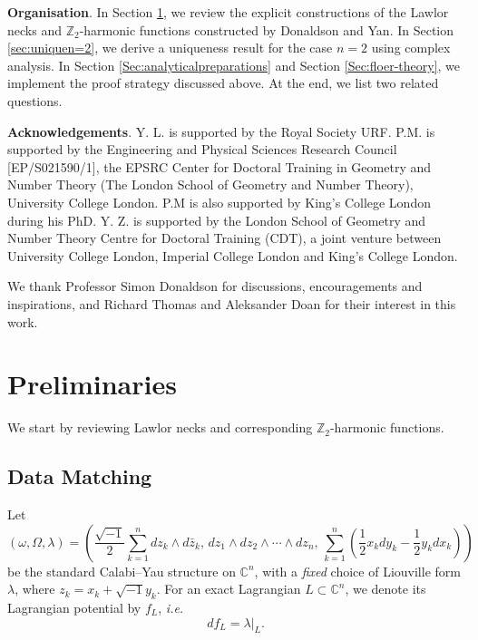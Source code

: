 \documentclass[11pt,a4paper]{article}
\numberwithin{equation}{section}%
\theoremstyle{definition}
\newcommand{\ie}{\emph{i.e.} }
\newcommand{\C}{\mathbb{C}}
\newcommand{\Z}{\mathbb{Z}}
\begin{document}
\textbf{Organisation}. In Section \ref{Sec:preliminaries}, we review the explicit constructions of the Lawlor necks and $\Z_2$-harmonic functions constructed by Donaldson and Yan. In Section \ref{sec:uniquen=2}, we derive a uniqueness result for the case $n=2$ using complex analysis. In Section \ref{Sec:analyticalpreparations} and Section \ref{Sec:floer-theory}, we implement the proof strategy discussed above. At the end, we list two related questions. 

\textbf{Acknowledgements}. Y. L. is supported by the Royal Society URF. P.M.  is supported by the Engineering and Physical Sciences Research Council [EP/S021590/1], the EPSRC Center for Doctoral Training in Geometry and Number Theory (The London School of Geometry and Number Theory), University College London. P.M is also supported by King’s College London during his PhD. Y. Z. is supported by the London School of Geometry and Number Theory Centre for Doctoral Training (CDT), a joint venture between University College London, Imperial College London and King’s College London.

We thank Professor Simon Donaldson for discussions, encouragements and inspirations, and  Richard Thomas and Aleksander Doan for their interest in this work.  



\section{Preliminaries}
\label{Sec:preliminaries}
We start by reviewing Lawlor necks and corresponding $\Z_2$-harmonic functions. 

\subsection{Data Matching}

Let
\begin{equation}
    \label{eqn:Cn-CYstr}
    (\omega,\Omega,\lambda)=
    \left(
    \frac{\sqrt{-1}}{2}\sum\limits_{k=1}^n dz_k\wedge d\bar z_k,\,
    dz_1\wedge dz_2\wedge \cdots\wedge dz_n,\,
    {\sum_{k=1}^{n}}\left(\frac{1}{2}x_kdy_k-\frac{1}{2}y_kdx_k\right)
    \right)
\end{equation}
be the standard Calabi--Yau structure on $\C^n$, with a \textit{fixed} choice of Liouville form $\lambda$, where $z_k=x_k+\sqrt{-1}y_k$. For an exact Lagrangian $L\subset \C^n$, we denote its Lagrangian potential by $f_L$, \ie
\[
    df_{L}=\lambda|_{L}.
\]
\end{document}
